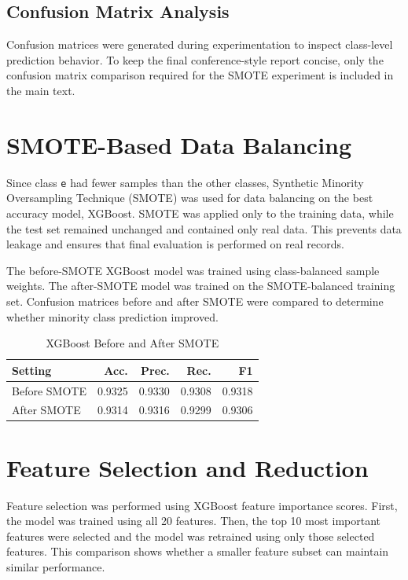 \documentclass[conference]{IEEEtran}
\begin{document}
\subsection{Confusion Matrix Analysis}
Confusion matrices were generated during experimentation to inspect class-level prediction behavior. To keep the final conference-style report concise, only the confusion matrix comparison required for the SMOTE experiment is included in the main text.

\section{SMOTE-Based Data Balancing}
Since class \texttt{e} had fewer samples than the other classes, Synthetic Minority Oversampling Technique (SMOTE) was used for data balancing on the best accuracy model, XGBoost. SMOTE was applied only to the training data, while the test set remained unchanged and contained only real data. This prevents data leakage and ensures that final evaluation is performed on real records.

The before-SMOTE XGBoost model was trained using class-balanced sample weights. The after-SMOTE model was trained on the SMOTE-balanced training set. Confusion matrices before and after SMOTE were compared to determine whether minority class prediction improved.

\begin{table}[htbp]
\caption{XGBoost Before and After SMOTE}
\begin{center}
\begin{tabular}{lrrrr}
\toprule
\textbf{Setting} & \textbf{Acc.} & \textbf{Prec.} & \textbf{Rec.} & \textbf{F1} \\
\midrule
Before SMOTE & 0.9325 & 0.9330 & 0.9308 & 0.9318 \\
After SMOTE & 0.9314 & 0.9316 & 0.9299 & 0.9306 \\
\bottomrule
\end{tabular}
\label{tab:smote-results}
\end{center}
\end{table}

\section{Feature Selection and Reduction}
Feature selection was performed using XGBoost feature importance scores. First, the model was trained using all 20 features. Then, the top 10 most important features were selected and the model was retrained using only those selected features. This comparison shows whether a smaller feature subset can maintain similar performance.
\end{document}
